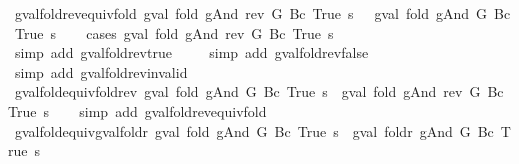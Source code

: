 \begin{isabellebody}
\endisatagproof
{\isafoldproof}%
%
\isadelimproof
\isanewline
%
\endisadelimproof
\isanewline
{}\isamarkupfalse%
\ gval{\isacharunderscore}fold{\isacharunderscore}rev{\isacharunderscore}equiv{\isacharunderscore}fold{\isacharcolon}\ {\isachardoublequoteopen}gval\ {\isacharparenleft}fold\ gAnd\ {\isacharparenleft}rev\ G{\isacharparenright}\ {\isacharparenleft}Bc\ True{\isacharparenright}{\isacharparenright}\ s\ {\isacharequal}\ \ gval\ {\isacharparenleft}fold\ gAnd\ G\ {\isacharparenleft}Bc\ True{\isacharparenright}{\isacharparenright}\ s{\isachardoublequoteclose}\isanewline
%
\isadelimproof
\ \ %
\endisadelimproof
%
\isatagproof
{}\isamarkupfalse%
\ {\isacharparenleft}cases\ {\isachardoublequoteopen}gval\ {\isacharparenleft}fold\ gAnd\ {\isacharparenleft}rev\ G{\isacharparenright}\ {\isacharparenleft}Bc\ True{\isacharparenright}{\isacharparenright}\ s{\isachardoublequoteclose}{\isacharparenright}\isanewline
\ \ \ \ \isamarkupfalse%
\ {\isacharparenleft}simp\ add{\isacharcolon}\ gval{\isacharunderscore}fold{\isacharunderscore}rev{\isacharunderscore}true{\isacharparenright}\isanewline
\ \ \ \isamarkupfalse%
\ {\isacharparenleft}simp\ add{\isacharcolon}\ gval{\isacharunderscore}fold{\isacharunderscore}rev{\isacharunderscore}false{\isacharparenright}\isanewline
\ \ \isamarkupfalse%
\ {\isacharparenleft}simp\ add{\isacharcolon}\ gval{\isacharunderscore}fold{\isacharunderscore}rev{\isacharunderscore}invalid{\isacharparenright}%
\endisatagproof
{\isafoldproof}%
%
\isadelimproof
\isanewline
%
\endisadelimproof
\isanewline
{}\isamarkupfalse%
\ gval{\isacharunderscore}fold{\isacharunderscore}equiv{\isacharunderscore}fold{\isacharunderscore}rev{\isacharcolon}\ {\isachardoublequoteopen}gval\ {\isacharparenleft}fold\ gAnd\ G\ {\isacharparenleft}Bc\ True{\isacharparenright}{\isacharparenright}\ s\ {\isacharequal}\ gval\ {\isacharparenleft}fold\ gAnd\ {\isacharparenleft}rev\ G{\isacharparenright}\ {\isacharparenleft}Bc\ True{\isacharparenright}{\isacharparenright}\ s{\isachardoublequoteclose}\isanewline
%
\isadelimproof
\ \ %
\endisadelimproof
%
\isatagproof
{}\isamarkupfalse%
\ {\isacharparenleft}simp\ add{\isacharcolon}\ gval{\isacharunderscore}fold{\isacharunderscore}rev{\isacharunderscore}equiv{\isacharunderscore}fold{\isacharparenright}%
\endisatagproof
{\isafoldproof}%
%
\isadelimproof
\isanewline
%
\endisadelimproof
\isanewline
{}\isamarkupfalse%
\ gval{\isacharunderscore}fold{\isacharunderscore}equiv{\isacharunderscore}gval{\isacharunderscore}foldr{\isacharcolon}\ {\isachardoublequoteopen}gval\ {\isacharparenleft}fold\ gAnd\ G\ {\isacharparenleft}Bc\ True{\isacharparenright}{\isacharparenright}\ s\ {\isacharequal}\ gval\ {\isacharparenleft}foldr\ gAnd\ G\ {\isacharparenleft}Bc\ True{\isacharparenright}{\isacharparenright}\ s{\isachardoublequoteclose}\isanewline

\end{isabellebody}
